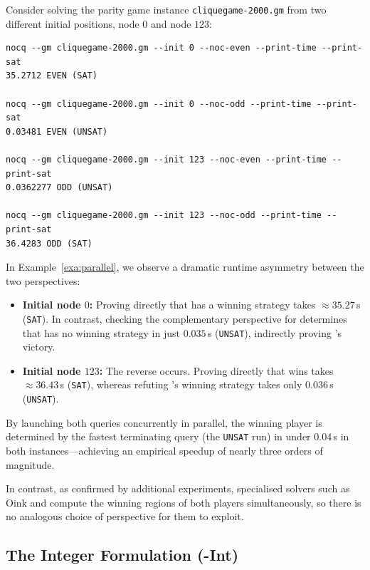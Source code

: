 \documentclass[a4paper,fleqn]{cas-sc}
\begin{document}
\begin{example}\label{exa:parallel}
Consider solving the parity game instance \texttt{cliquegame-2000.gm} from two different initial positions, node $0$ and node $123$:

\begin{verbatim}
nocq --gm cliquegame-2000.gm --init 0 --noc-even --print-time --print-sat
35.2712 EVEN (SAT)

nocq --gm cliquegame-2000.gm --init 0 --noc-odd --print-time --print-sat
0.03481 EVEN (UNSAT)

nocq --gm cliquegame-2000.gm --init 123 --noc-even --print-time --print-sat
0.0362277 ODD (UNSAT)

nocq --gm cliquegame-2000.gm --init 123 --noc-odd --print-time --print-sat
36.4283 ODD (SAT)
\end{verbatim}

\noindent
In Example~\ref{exa:parallel}, we observe a dramatic runtime asymmetry between the two perspectives:
\begin{itemize}
    \item \textbf{Initial node $0$:} Proving directly that \even has a winning strategy takes $\approx 35.27$\,s (\texttt{SAT}). In contrast, checking the complementary perspective for \odd determines that \odd has no winning strategy in just $0.035$\,s (\texttt{UNSAT}), indirectly proving \even's victory.
    \item \textbf{Initial node $123$:} The reverse occurs. Proving directly that \odd wins takes $\approx 36.43$\,s (\texttt{SAT}), whereas refuting \even's winning strategy takes only $0.036$\,s (\texttt{UNSAT}).
\end{itemize}
By launching both queries concurrently in parallel, the winning player is determined by the fastest terminating query (the \texttt{UNSAT} run) in under $0.04$\,s in both instances—achieving an empirical speedup of nearly three orders of magnitude.
\end{example}

In contrast, as confirmed by additional experiments, specialised solvers such as Oink and \zra compute the winning regions of both players simultaneously, so there is no analogous choice of perspective for them to exploit.

\subsection{The Integer Formulation (\nooppc-Int)}\label{sec:noc_int}
\end{document}

